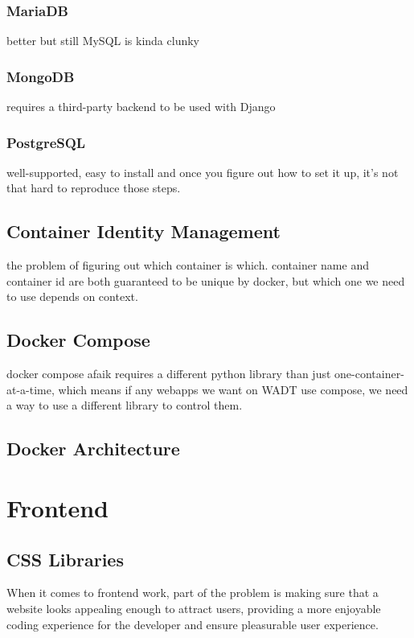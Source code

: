 \documentclass[12pt]{article}
\begin{document}
\subsubsection{MariaDB}
better but still MySQL is kinda clunky

\subsubsection{MongoDB}
requires a third-party backend to be used with Django

\subsubsection{PostgreSQL}
well-supported, easy to install and once you figure out how to set it up, it's not that hard to reproduce those steps.

\subsection{Container Identity Management}
the problem of figuring out which container is which. container name and container id are both guaranteed to be unique by docker, but which one we need to use depends on context.

\subsection{Docker Compose}
docker compose afaik requires a different python library than just
one-container-at-a-time, which means if any webapps we want on WADT
use compose, we need a way to use a different library to control them.

\subsection{Docker Architecture}


\section{Frontend}

\subsection{CSS Libraries}
When it comes to frontend work, part of the problem is making sure that a website looks appealing enough to attract users, providing a more enjoyable coding experience for the developer and ensure pleasurable user experience. %
\end{document}
